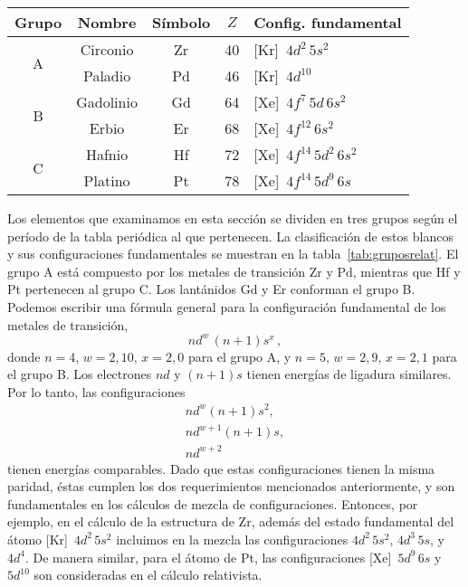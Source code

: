 \begin{table*}[t]
\centering
\begin{tabular}{|c|c|c|c|l|}
\hline
Grupo & Nombre   & Símbolo & $Z$ & Config. fundamental \\
\hline
\hline
\multirow{2}{*}{A} & Circonio & Zr & 40 & [Kr]~$4d^2\,5s^2$ \\
                   & Paladio  & Pd & 46 & [Kr]~$4d^{10}$ \\
\hline
\multirow{2}{*}{B} & Gadolinio & Gd & 64 & [Xe]~$4f^7\,5d\,6s^2$ \\
                   & Erbio     & Er & 68 & [Xe]~$4f^{12}\,6s^2$ \\
\hline
\multirow{2}{*}{C} & Hafnio  & Hf & 72 & [Xe]~$4f^{14}\,5d^2\,6s^2$ \\
                   & Platino & Pt & 78 & [Xe]~$4f^{14}\,5d^9\,6s$ \\
\hline
\end{tabular}
\caption[Blancos relativistas y sus configuraciones fundamentales]
{Blancos relativistas y sus configuraciones fundamentales.}
\label{tab:gruposrelat} 
\end{table*}

Los elementos que examinamos en esta sección se dividen en tres grupos 
según el período de la tabla periódica al que pertenecen. La 
clasificación de estos blancos y sus configuraciones fundamentales se
muestran en la tabla~\ref{tab:gruposrelat}. El grupo A está compuesto 
por los metales de transición Zr y Pd, mientras que Hf y Pt pertenecen 
al grupo C. Los lantánidos Gd y Er conforman el grupo B. 
Podemos escribir una fórmula general para la configuración fundamental 
de los metales de transición, 
\begin{equation}
nd^w\,(n+1)s^x\,,
\end{equation}
donde $n=4$, $w=2,10$, $x=2,0$ para el grupo A, y $n=5$, $w=2,9$, 
$x=2,1$ para el grupo B. Los electrones $nd$ y $(n+1)s$ tienen energías 
de ligadura similares. Por lo tanto, las configuraciones 
\begin{gather}
nd^w(n+1)s^2, \\
nd^{w+1}(n+1)s, \\
nd^{w+2}
\end{gather}
tienen energías comparables. Dado que estas configuraciones tienen la 
misma paridad, éstas cumplen los dos requerimientos mencionados 
anteriormente, y son fundamentales en los cálculos de mezcla de 
configuraciones. Entonces, por ejemplo, en el cálculo de la estructura 
de Zr, además del estado fundamental del átomo [Kr]~$4d^2\,5s^2$ 
incluimos en la mezcla las configuraciones $4d^2\,5s^2$, $4d^3\,5s$, y 
$4d^4$. De manera similar, para el átomo de Pt, las configuraciones
[Xe]~$5d^9\,6s$ y $5d^{10}$ son consideradas en el cálculo relativista.

